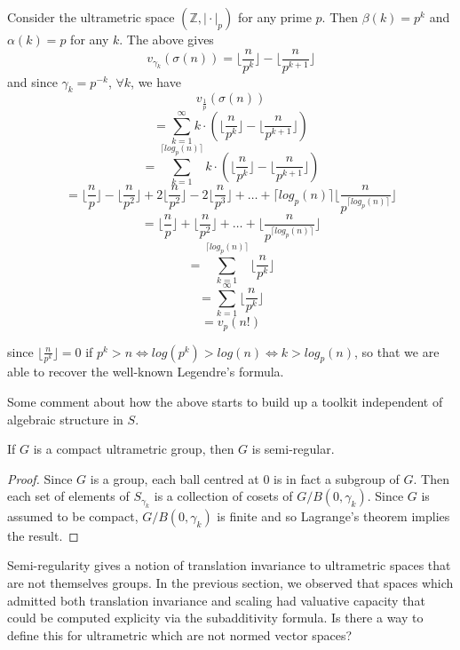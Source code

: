 \begin{example}
Consider the ultrametric space $(\mathbb{Z}, \rvert \cdot \lvert_p)$  for any prime $p$. Then $\beta(k)=p^k$ and $\alpha(k)=p$ for any $k$. The above gives 
\[v_{\gamma_k}(\sigma(n)) =\lfloor \frac{n}{p^{k}}\rfloor - \lfloor \frac{n}{p^{k+1}} \rfloor\]
and since $\gamma_k = p^{-k}$, $\forall k$, we have 
\[v_{\frac{1}{p}}(\sigma(n)) \]
\[ = \sum_{k=1}^{\infty} k \cdot (\lfloor \frac{n}{p^{k}}\rfloor - \lfloor \frac{n}{p^{k+1}} \rfloor) \]
\[ = \sum_{k=1}^{\lceil log_p(n) \rceil}  k \cdot (\lfloor \frac{n}{p^{k}}\rfloor - \lfloor \frac{n}{p^{k+1}} \rfloor)\]
\[ = \lfloor \frac{n}{p}\rfloor - \lfloor \frac{n}{p^{2}} \rfloor +  2\lfloor \frac{n}{p^2}\rfloor - 2\lfloor \frac{n}{p^3} \rfloor + \ldots +  \lceil log_p(n)\rceil \lfloor \frac{n}{p^{ \lceil log_p(n)\rceil}} \rfloor \]
\[ = \lfloor \frac{n}{p}\rfloor + \lfloor \frac{n}{p^2}\rfloor  + \ldots +  \lfloor \frac{n}{p^{ \lceil log_p(n)\rceil}} \rfloor \]
\[ =  \sum_{k=1}^{\lceil log_p(n) \rceil} \lfloor \frac{n}{p^{k}}\rfloor \]
\[ =  \sum_{k=1}^{\infty} \lfloor \frac{n}{p^{k}}\rfloor \]
\[= v_{p}(n!) \]

since $\lfloor \frac{n}{p^k} \rfloor = 0$ if $ p^k > n \iff log(p^k) > log(n) \iff k > log_p(n)$, so that we are able to recover the well-known Legendre's formula.
\end{example}

Some comment about how the above starts to build up a toolkit independent of  algebraic structure in $S$.

\begin{corollary*}
If $G$ is a compact ultrametric group, then $G$  is semi-regular.
\end{corollary*}

\begin{proof}
Since $G$ is a group, each ball centred at $0$ is in fact a subgroup of $G$. Then each set of elements of $S_{\gamma_k}$ is a collection of cosets of $G/B(0,\gamma_k)$. Since $G$ is assumed to be compact, $G/B(0,\gamma_k)$ is finite and so Lagrange's theorem implies the result.
\end{proof}

Semi-regularity gives a notion of translation invariance to ultrametric spaces that are not themselves groups. In the previous section, we observed that spaces which admitted both translation invariance and scaling had valuative capacity that could be computed explicity via the subadditivity formula. Is there a way to define this for ultrametric which are not normed vector spaces?

